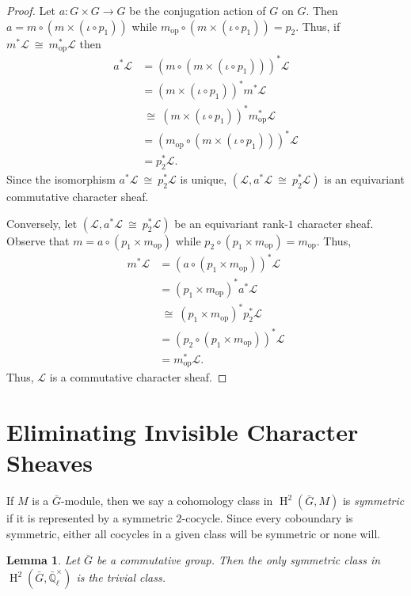 \documentclass[10pt]{amsart}
\theoremstyle{plain}
\newtheorem{lemma}[theorem]{Lemma}
\theoremstyle{definition}
\newcommand{\EE}{\mathbb{\bar Q}_\ell}
\newcommand{\EEx}{\EE^\times}
\DeclareMathOperator{\Hh}{H}
\newcommand{\op}{_{\operatorname{op}}}
\newcommand{\iso}{{\ \cong\ }}
\newcommand{\cs}[1]{{\mathcal{#1}}}
\newcommand{\bG}{\bar{G}}
\begin{document}
\begin{proof}
Let $a : G \times G \to G$ be the conjugation action of $G$ on $G$. Then $a = m \circ (m \times (\iota \circ p_1))$ while $m\op \circ (m \times (\iota \circ p_1)) = p_2$. Thus, if $m^*\cs{L} \iso m\op^*\cs{L}$ then
\begin{align*}
a^* \cs{L} 
&= (m \circ (m \times (\iota \circ p_1)))^* \cs{L}\\
&= (m \times (\iota \circ p_1))^* m^* \cs{L}\\
&\iso (m \times (\iota \circ p_1))^* m\op^* \cs{L}\\
&= (m\op \circ (m \times (\iota \circ p_1)))^* \cs{L}\\
&= p_2^*\cs{L}.
\end{align*}
Since the isomorphism $a^*\cs{L} \iso p_2^*\cs{L}$ is unique, $(\cs{L}, a^*\cs{L} \iso p_2^*\cs{L})$ is an equivariant commutative character sheaf.

Conversely, let $(\cs{L}, a^*\cs{L} \iso p_2^*\cs{L})$ be an equivariant rank-$1$ character sheaf.
Observe that $m = a \circ (p_1\times m\op)$ while $p_2 \circ (p_1\times m\op) = m\op$. Thus, 
\begin{align*}
m^* \cs{L} 
&= (a \circ (p_1 \times m\op))^* \cs{L}\\
&= (p_1 \times m\op)^* a^* \cs{L}\\
&\iso (p_1 \times m\op)^* p_2^* \cs{L}\\
&= (p_2\circ (p_1 \times m\op))^* \cs{L}\\
&= m\op^* \cs{L}.
\end{align*}
Thus, $\cs{L}$ is a commutative character sheaf.
\end{proof}


\section{Eliminating Invisible Character Sheaves}\label{sec:defect}

If $M$ is a $\bG$-module, then we say a cohomology class in $\Hh^2(\bG, M)$ is \emph{symmetric} if it is represented
by a symmetric $2$-cocycle.  Since every coboundary is symmetric, either all cocycles in a given class will be symmetric
or none will.

\begin{lemma} \label{lem:symtriv}
Let $\bG$ be a commutative group.  Then the only symmetric class in $\Hh^2(\bG, \EEx)$ is the trivial class.
\end{lemma}
\end{document}
